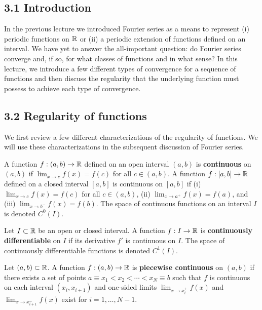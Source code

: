 

\subsection{3.1 Introduction}
In the previous lecture we introduced Fourier series as a means to represent (i) periodic functions on $\mathbb{R}$ or (ii) a periodic extension of functions defined on an interval. We have yet to answer the all-important question: do Fourier series converge and, if so, for what classes of functions and in what sense? In this lecture, we introduce a few different types of convergence for a sequence of functions and then discuss the regularity that the underlying function must possess to achieve each type of convergence.

\subsection{3.2 Regularity of functions}
We first review a few different characterizations of the regularity of functions. We will use these characterizations in the subsequent discussion of Fourier series.

\begin{definition}
    A function $f : (a, b) \to \mathbb{R}$ defined on an open interval $(a, b)$ is \textbf{continuous} on $(a, b)$ if $\lim_{x \to c} f(x) = f(c)$ for all $c \in (a, b)$. A function $f : [a, b] \to \mathbb{R}$ defined on a closed interval $[a, b]$ is continuous on $[a, b]$ if (i) $\lim_{x \to c} f(x) = f(c)$ for all $c \in (a, b)$, (ii) $\lim_{x \to a^+} f(x) = f(a)$, and (iii) $\lim_{x \to b^-} f(x) = f(b)$. The space of continuous functions on an interval $I$ is denoted $C^0(I)$.
\end{definition}

\begin{definition}
    Let $I \subset \mathbb{R}$ be an open or closed interval. A function $f : I \to \mathbb{R}$ is \textbf{continuously differentiable} on $I$ if its derivative $f'$ is continuous on $I$. The space of continuously differentiable functions is denoted $C^1(I)$.
\end{definition}

\begin{definition}
    Let $(a, b) \subset \mathbb{R}$. A function $f : (a, b) \to \mathbb{R}$ is \textbf{piecewise continuous} on $(a, b)$ if there exists a set of points $a \equiv x_1 < x_2 < \cdots < x_N \equiv b$ such that $f$ is continuous on each interval $(x_i, x_{i+1})$ and one-sided limits $\lim_{x \to x_i^+} f(x)$ and $\lim_{x \to x_{i+1}^-} f(x)$ exist for $i = 1, \dots, N - 1$.
\end{definition}

